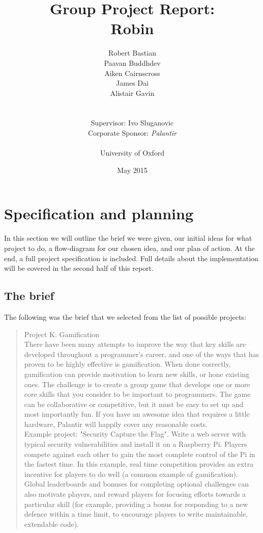 \documentclass{report}
\title{Group Project Report:\\Robin}
\author{Robert Bastian\\Paavan Buddhdev\\Aiken Cairnscross\\James Dai\\Alistair Gavin\\\\\\Supervisor: Ivo Sluganovic\\Corporate Sponsor: \emph{Palantir}\\\\University of Oxford}
\date{May 2015}
\begin{document}
\maketitle
\tableofcontents

\chapter{Specification and planning}
In this section we will outline the brief we were given, our initial ideas for what project to do, a flow-diagram for our chosen idea, and our plan of action. At the end, a full project specification is included. Full details about the implementation will be covered in the second half of this report.

\section{The brief}
The following was the brief that we selected from the list of possible projects:

\begin{quote}Project K: Gamification\\There have been many attempts to improve the way that key skills are developed throughout a programmer's career, and one of the ways that has proven to be highly effective is gamification. When done correctly, gamification can provide motivation to learn new skills, or hone existing ones. The challenge is to create a group game that develops one or more core skills that you consider to be important to programmers. The game can be collaborative or competitive, but it must be easy to set up and most importantly fun. If you have an awesome idea that requires a little hardware, Palantir will happily cover any reasonable costs.\\Example project: "Security Capture the Flag". Write a web server with typical security vulnerabilities and install it on a Raspberry Pi. Players compete against each other to gain the most complete control of the Pi in the fastest time. In this example, real time competition provides an extra incentive for players to do well (a common example of gamification). Global leaderboards and bonuses for completing optional challenges can also motivate players, and reward players for focusing efforts towards a particular skill (for example, providing a bonus for responding to a new defence within a time limit, to encourage players to write maintainable, extendable code).\end{quote}
\end{document}
